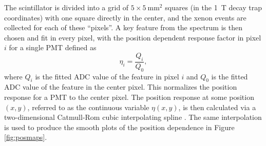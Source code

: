The scintillator is divided into a grid of $5\times5\mathrm{~mm}^2$ squares (in the 1~T
decay trap coordinates) with one square directly in the center,
and the xenon events are collected for each of these ``pixels''. A key feature
from the spectrum is then chosen and fit in every pixel, with the position dependent response
factor in pixel $i$ for a single PMT defined as
%
\begin{equation}
  \eta_i = \frac{Q_i}{Q_0},
\end{equation}
%
where $Q_i$ is the fitted ADC value of the feature in pixel $i$ and $Q_0$ is the fitted ADC value of the
feature in the center pixel. This normalizes the position response for a PMT to the center pixel. The
position response at some position $(x,y)$, referred to as the continuous variable $\eta(x,y)$,
is then calculated via a two-dimensional Catmull-Rom
cubic interpolating spline \cite{catmull1974,mpmThesis}. The same interpolation is used to produce the smooth
plots of the
position dependence in Figure \ref{fig:posmaps}.


